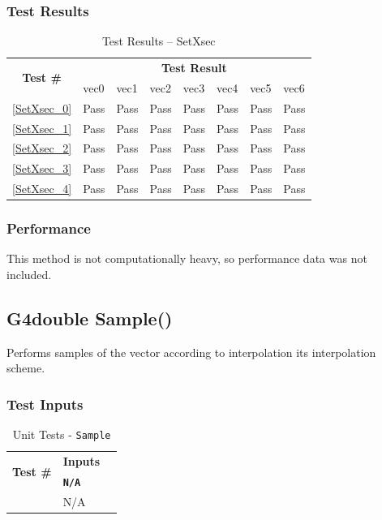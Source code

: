 \documentclass[12pt]{article}
\newcounter{TestCounter}
\begin{document}
	\subsubsection{Test Results}
		\begin{table}[H]
		\centering
		\caption{Test Results -- SetXsec}\label{SetXsec_acc}
		\begin{tabular}{clllllll}
		\toprule
		\multirow{2}{*}{\bf Test \#} & \multicolumn{7}{c}{\bf Test Result}\\
		& vec0 & vec1 & vec2 & vec3 & vec4 & vec5 & vec6\\\midrule
		\ref{SetXsec_0} & Pass & Pass & Pass & Pass & Pass & Pass & Pass\\
		\ref{SetXsec_1} & Pass & Pass & Pass & Pass & Pass & Pass & Pass\\
		\ref{SetXsec_2} & Pass & Pass & Pass & Pass & Pass & Pass & Pass\\
		\ref{SetXsec_3} & Pass & Pass & Pass & Pass & Pass & Pass & Pass\\
		\ref{SetXsec_4} & Pass & Pass & Pass & Pass & Pass & Pass & Pass\\
		\bottomrule
		\end{tabular}
		\end{table}

	\subsubsection{Performance}
		This method is not computationally heavy, so performance data was not included.

\subsection{G4double Sample()}
	
	  Performs samples of the vector according to interpolation its interpolation scheme.
	
	\subsubsection{Test Inputs}
		\begin{table}[H]
		\centering
		\caption{Unit Tests - \texttt{Sample}}\label{Sample_unit}
		\begin{tabular}{lll}
		\toprule
		\multirow{2}{*}{\bf Test \#}  & \multicolumn{1}{c}{\bf Inputs}\\
		& \bf \texttt{N/A}\\\midrule
		{TestCounter}\arabic{TestCounter}\label{Sample_0} & N/A \\
		\bottomrule
		\end{tabular}
		\end{table}
	
\end{document}
